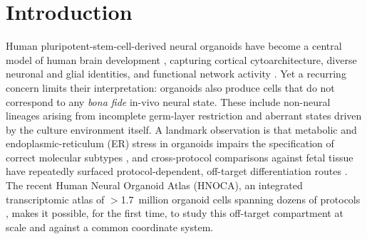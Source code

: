 \documentclass[11pt]{article}
\begin{document}
\begin{abstract}
here) and read the specifically in-vitro biology from the stress diagnostics rather than from the
adversary. Finally, on the \emph{non-neural} contaminant populations, where, unlike the
reference-limited neural compartment, we are statistically powered, we show the geometry method works as
an instrument: pairwise distances clear a matched-$N$ noise floor ($14$--$105\times$) and their
\emph{rank order} recovers the primary lineage geometry (distance-matrix $r=0.90$). A direct test,
however, finds the per-lineage source offsets are not constant (mutual cosine $0.15$), so the individual
distances are confounded rather than clean lineage metrics, a validated ordering, not yet a clean
geometry. NullState thus provides a reference-anchored, \emph{comparative} off-target measurement, to be
read against the reference's own domain, not as an absolute fidelity score, together with a delineation
of which \emph{objectives} can calibrate a latent without anchoring in this regime, and which cannot.
\end{abstract}

\vspace{0.5em}

\section{Introduction}
Human pluripotent-stem-cell-derived neural organoids have become a central model of human brain
development \citep{lancaster2013organoids,pasca2015cortical}, capturing cortical cytoarchitecture,
diverse neuronal and glial identities, and functional network activity
\citep{quadrato2017organoids,velasco2019organoids,trujillo2019oscillatory}. Yet a recurring concern
limits their interpretation: organoids also produce cells that do not correspond to any \emph{bona
fide} in-vivo neural state. These include non-neural lineages arising from incomplete germ-layer
restriction and aberrant states driven by the culture environment itself. A landmark observation is
that metabolic and endoplasmic-reticulum (ER) stress in organoids impairs the specification of correct
molecular subtypes \citep{bhaduri2020stress}, and cross-protocol comparisons against fetal tissue have
repeatedly surfaced protocol-dependent, off-target differentiation routes
\citep{tanaka2020synthetic,kanton2019atlas}. The recent Human Neural Organoid Atlas
(HNOCA), an integrated transcriptomic atlas of $>$1.7~million organoid cells spanning dozens of
protocols \citep{he2024hnoca}, makes it possible, for the first time, to study this off-target
compartment at scale and against a common coordinate system.
\end{document}
